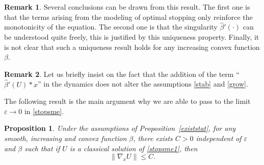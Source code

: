 \documentclass[JEP,XML,SOM,Unicode,NoEqCountersInSection,published]{cedram}
\let\epsilon\varepsilon
\newtheorem{Prop}{Proposition}[section]
\theoremstyle{definition}
\newtheorem{Rem}{Remark}[section]
\begin{document}
\begin{Rem}
Several conclusions can be drawn from this result. The first one is that the terms arising from the modeling of optimal stopping only reinforce the monotonicity of the equation. The second one is that the singularity $\hat{\beta}'(\cdot)$ can be understood quite freely, this is justified by this uniqueness property. Finally, it is not clear that such a uniqueness result holds for any increasing convex function $\beta$.
\end{Rem}
\begin{Rem}
Let us briefly insist on the fact that the addition of the term \hbox{``$\hat{\beta}'(U)*x$''} in the dynamics does not alter the assumptions \ref{stab} and \ref{grow}.
\end{Rem}
The following result is the main argument why we are able to pass to the limit $\epsilon \to 0$ in \eqref{stopsme}.
\begin{Prop}\label{estimatestop}
Under the assumptions of Proposition~\ref{existstat}, for any smooth, increasing and convex function $\beta$, there exists $C > 0$ independent of $ \epsilon$ and $\beta$ such that if $U$ is a classical solution of \eqref{stopsme1}, then
\begin{equation}\label{estint}
\|\nabla_x U\| \leq C.
\end{equation}
\end{Prop}
\end{document}
